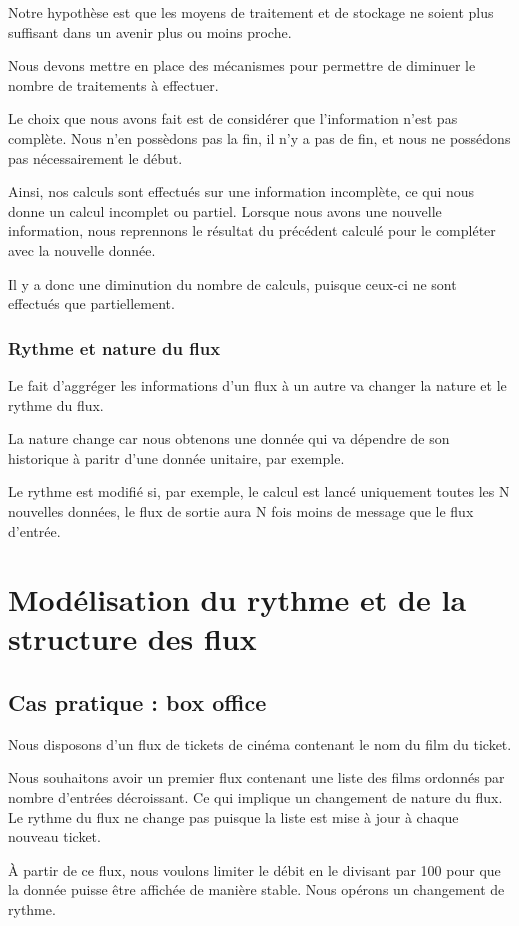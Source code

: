 \documentclass{llncs}
\begin{document}
Notre hypothèse est que les moyens de traitement et de stockage ne soient plus
suffisant dans un avenir plus ou moins proche.

Nous devons mettre en place des mécanismes pour permettre de diminuer le nombre
de traitements à effectuer.

Le choix que nous avons fait est de considérer que l'information n'est pas complète.
Nous n'en possèdons pas la fin, il n'y a pas de fin, et nous ne possédons pas
nécessairement le début.

Ainsi, nos calculs sont effectués sur une information incomplète, ce qui nous
donne un calcul incomplet ou partiel.
Lorsque nous avons une nouvelle information, nous reprennons le résultat du
précédent calculé pour le compléter avec la nouvelle donnée.

Il y a donc une diminution du nombre de calculs, puisque ceux-ci ne sont effectués
que partiellement.

\subsubsection{Rythme et nature du flux}
Le fait d'aggréger les informations d'un flux à un autre va changer la nature et
le rythme du flux.

La nature change car nous obtenons une donnée qui va dépendre de son historique
à paritr d'une donnée unitaire, par exemple.

Le rythme est modifié si, par exemple, le calcul est lancé uniquement toutes les
N nouvelles données, le flux de sortie aura N fois moins de message que le flux d'entrée.

\section{Modélisation du rythme et de la structure des flux}
\subsection{Cas pratique : box office}
Nous disposons d'un flux de tickets de cinéma contenant le nom du film du ticket.

Nous souhaitons avoir un premier flux contenant une liste des films ordonnés par
nombre d'entrées décroissant.
Ce qui implique un changement de nature du flux.
Le rythme du flux ne change pas puisque la liste est mise à jour à chaque nouveau
ticket.

À partir de ce flux, nous voulons limiter le débit en le divisant par 100 pour
que la donnée puisse être affichée de manière stable.
Nous opérons un changement de rythme.
\end{document}
